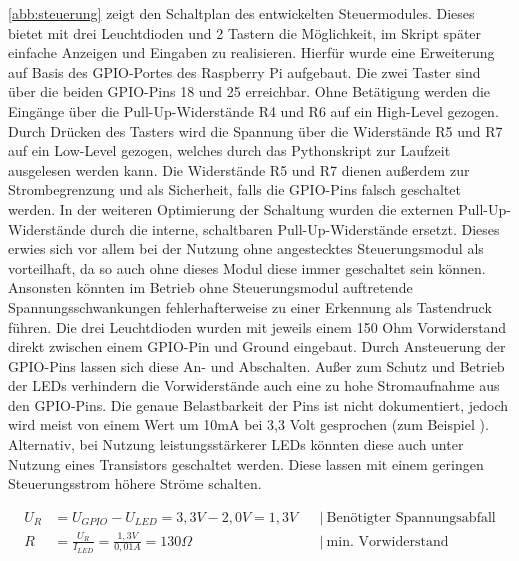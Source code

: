 \documentclass[a4paper,12pt,bibliography=totoc, listof=totoc,titlepage,pointlessnumbers]{scrreprt}
\begin{document}
\autoref{abb:steuerung} zeigt den Schaltplan des entwickelten Steuermodules. Dieses bietet mit drei Leuchtdioden und 2 Tastern die Möglichkeit, im Skript später einfache Anzeigen und Eingaben zu realisieren. Hierfür wurde eine Erweiterung auf Basis des GPIO-Portes des Raspberry Pi aufgebaut. Die zwei Taster sind über die beiden GPIO-Pins 18 und 25 erreichbar. Ohne Betätigung werden die Eingänge über die Pull-Up-Widerstände R4 und R6 auf ein High-Level gezogen. Durch Drücken des Tasters wird die Spannung über die Widerstände R5 und R7 auf ein Low-Level gezogen, welches durch das Pythonskript zur Laufzeit ausgelesen werden kann. Die Widerstände R5 und R7 dienen außerdem zur Strombegrenzung und als Sicherheit, falls die GPIO-Pins falsch geschaltet werden. In der weiteren Optimierung der Schaltung wurden die externen Pull-Up-Widerstände durch die interne, schaltbaren Pull-Up-Widerstände ersetzt. Dieses erwies sich vor allem bei der Nutzung ohne angestecktes Steuerungsmodul als vorteilhaft, da so auch ohne dieses Modul diese immer geschaltet sein können. Ansonsten könnten im Betrieb ohne Steuerungsmodul auftretende Spannungsschwankungen fehlerhafterweise zu einer Erkennung als Tastendruck führen.
Die drei Leuchtdioden wurden mit jeweils einem 150 Ohm Vorwiderstand direkt zwischen einem GPIO-Pin und Ground eingebaut. Durch Ansteuerung der GPIO-Pins lassen sich diese An- und Abschalten. Außer zum Schutz und Betrieb der LEDs verhindern die Vorwiderstände auch eine zu hohe Stromaufnahme aus den GPIO-Pins. Die genaue Belastbarkeit der Pins ist nicht dokumentiert, jedoch wird meist von einem Wert um 10mA bei 3,3 Volt gesprochen (zum Beispiel \citet{ekRaspPin}). Alternativ, bei Nutzung leistungsstärkerer LEDs könnten diese auch unter Nutzung eines Transistors geschaltet werden. Diese lassen mit einem geringen Steuerungsstrom höhere Ströme schalten.

\begin{equation}
\begin{aligned}
U_R &= U_{GPIO} - U_{LED} = 3,3V - 2,0V = 1,3V    && \left|\  \text{Benötigter Spannungsabfall} \right. \\
R &= \frac{U_R}{I_{LED}} = \frac{1,3V}{0,01A} = 130\Omega   && \left|\  \text{min. Vorwiderstand} \right. \\
\end{aligned}
\label{eq:vorwiderstand}
\end{equation}
\end{document}
